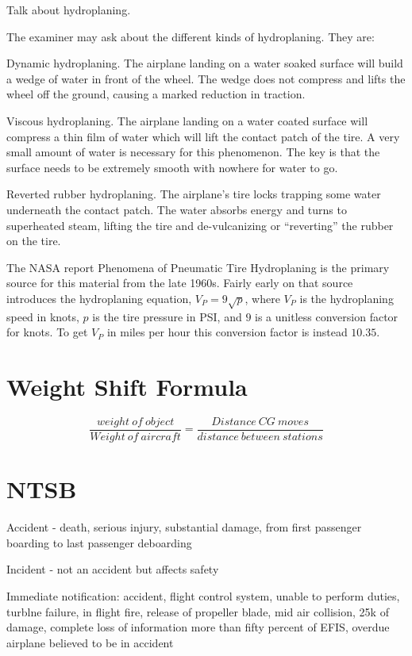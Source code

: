 Talk about hydroplaning.

The examiner may ask about the different kinds of hydroplaning. They are:

Dynamic hydroplaning. The airplane landing on a water soaked surface will build a wedge of water in front of the wheel. The wedge does not compress and lifts the wheel off the ground, causing a marked reduction in traction.

Viscous hydroplaning. The airplane landing on a water coated surface will compress a thin film of water which will lift the contact patch of the tire. A very small amount of water is necessary for this phenomenon. The key is that the surface needs to be extremely smooth with nowhere for water to go.

Reverted rubber hydroplaning. The airplane's tire locks trapping some water underneath the contact patch. The water absorbs energy and turns to superheated steam, lifting the tire and de-vulcanizing or ``reverting'' the rubber on the tire.

The NASA report Phenomena of Pneumatic Tire Hydroplaning \cite{hydroplane} is the primary source for this material from the late 1960s. Fairly early on that source introduces the hydroplaning equation, $V_P = 9 \sqrt{p}$, where $V_P$ is the hydroplaning speed in knots, $p$ is the tire pressure in PSI, and $9$ is a unitless conversion factor for knots. To get $V_P$ in miles per hour this conversion factor is instead $10.35$.

\section{Weight Shift Formula}

\begin{equation}
    \frac{weight\ of\ object}{Weight\ of\ aircraft} = \frac{Distance\ CG\ moves}{distance\ between\ stations}
\end{equation}

\section{NTSB}

Accident - death, serious injury, substantial damage, from first passenger boarding to last passenger deboarding

Incident - not an accident but affects safety

Immediate notification: accident, flight control system, unable to perform duties, turblne failure, in flight fire, release of propeller blade, mid air collision, 25k of damage, complete loss of information more than fifty percent of EFIS, overdue airplane believed to be in accident

